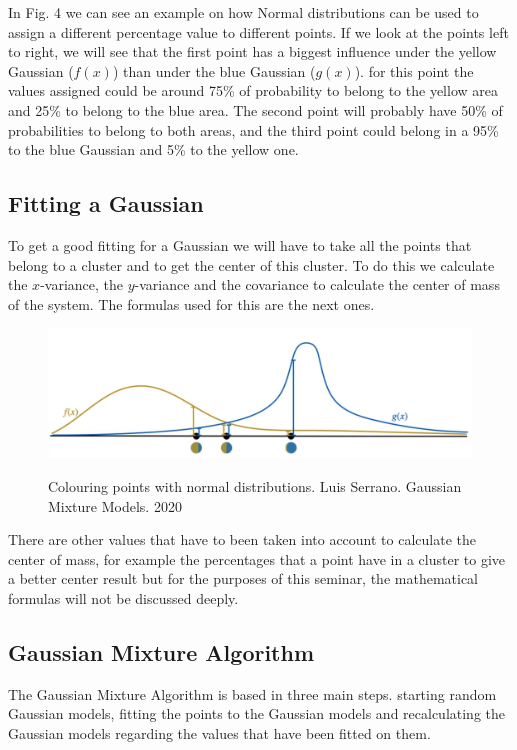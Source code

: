 \documentclass[conference]{IEEEtran}
\begin{document}
In Fig. 4 we can see an example on how Normal distributions can be used to assign a different percentage value to different points. If we look at the points left to right, we will see that the first point has a biggest influence under the yellow Gaussian ($f(x)$) than under the blue Gaussian ($g(x)$). for this point the values assigned could be around 75\% of probability to belong to the yellow area and 25\% to belong to the blue area. The second point will probably have 50\% of probabilities to belong to both areas, and the third point could belong in a 95\% to the blue Gaussian and 5\% to the yellow one.

\subsection{Fitting a Gaussian}

To get a good fitting for a Gaussian we will have to take all the points that belong to a cluster and to get the center of this cluster. To do this we calculate the $x$-variance, the $y$-variance and the covariance to calculate the center of mass of the system. The formulas used for this are the next ones.

\begin{figure}[h]
	\includegraphics[scale=0.19]{imgs/gaussian2.png}
	\label{fig:gaussian2}
	\caption{Colouring points with normal distributions. Luis Serrano. Gaussian Mixture Models. 2020}
\end{figure}

There are other values that have to been taken into account to calculate the center of mass, for example the percentages that a point have in a cluster to give a better center result but for the purposes of this seminar, the mathematical formulas will not be discussed deeply.

\subsection{Gaussian Mixture Algorithm}

The Gaussian Mixture Algorithm is based in three main steps. starting random Gaussian models, fitting the points to the Gaussian models and recalculating the Gaussian models regarding the values that have been fitted on them.
\end{document}
